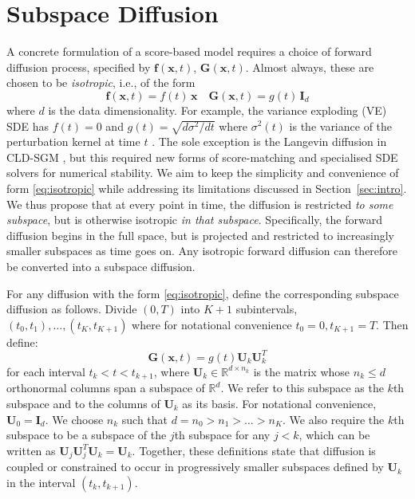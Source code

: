 \documentclass{article}
\begin{document}
\section{Subspace Diffusion} \label{sec:subspace}
A concrete formulation of a score-based model requires a choice of forward diffusion process, specified by $\mathbf{f}(\mathbf{x}, t)$, $\mathbf{G}(\mathbf{x}, t)$. Almost always, these are chosen to be \emph{isotropic}, i.e., of the form 
\begin{equation} \label{eq:isotropic}
    \mathbf{f}(\mathbf{x}, t) = f(t)\, \mathbf{x} \quad \mathbf{G}(\mathbf{x}, t) = g(t) \, \mathbf{I}_d
\end{equation} where $d$ is the data dimensionality. For example, the variance exploding (VE) SDE has $f(t)=0$ and $g(t) = \sqrt{d\sigma^2/dt}$ where $\sigma^2(t)$ is the variance of the perturbation kernel at time $t$ \cite{song2021score}. The sole exception is the Langevin diffusion in CLD-SGM \cite{dockhorn2021score}, but this required new forms of score-matching and specialised SDE solvers for numerical stability. We aim to keep the simplicity and convenience of form \eqref{eq:isotropic} while addressing its limitations discussed in Section~\ref{sec:intro}. We thus propose that at every point in time, the diffusion is restricted \emph{to some subspace}, but is otherwise isotropic \emph{in that subspace}. Specifically, the forward diffusion begins in the full space, but is projected and restricted to increasingly smaller subspaces as time goes on. Any isotropic forward diffusion can therefore be converted into a subspace diffusion.

For any diffusion with the form \eqref{eq:isotropic}, define the corresponding subspace diffusion as follows. Divide $(0, T)$ into $K+1$ subintervals, $(t_0, t_1), \ldots, (t_K, t_{K+1})$ where for notational convenience $t_0=0, t_{K+1}=T$. Then define:
\begin{equation} \label{eq:G}
    \mathbf{G}(\mathbf{x}, t) = g(t)\mathbf{U}_k\mathbf{U}_k^T    
\end{equation}
for each interval $t_k < t < t_{k+1}$, where $\mathbf{U}_k \in \mathbb{R}^{d \times n_k}$ is the matrix whose $n_k \le d$ orthonormal columns span a subspace of $\mathbb{R}^d$. We refer to this subspace as the $k$th subspace and to the columns of $\mathbf{U}_k$ as its basis. For notational convenience, $\mathbf{U}_0 = \mathbf{I}_d$. We choose $n_k$ such that $d = n_0 > n_1 > \ldots > n_K$. We also require the $k$th subspace to be a subspace of the $j$th subspace for any $j < k$, which can be written as $\mathbf{U}_{j}\mathbf{U}_{j}^T\mathbf{U}_{k}=\mathbf{U}_{k}$. Together, these definitions state that diffusion is coupled or constrained to occur in progressively smaller subspaces defined by $\mathbf{U}_k$ in the interval $(t_k, t_{k+1})$.
\end{document}
